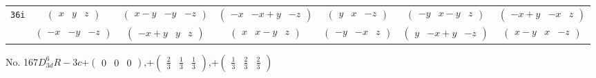 \documentclass[fleqn,9pt,landscape]{jsarticle}
\begin{document}
\begin{center}
\begin{longtable}{ccccccc}
{\tt 36i} & $ \begin{pmatrix} x & y & z \end{pmatrix} $ & $ \begin{pmatrix} x - y & - y & - z \end{pmatrix} $ & $ \begin{pmatrix} - x & - x + y & - z \end{pmatrix} $ & $ \begin{pmatrix} y & x & - z \end{pmatrix} $ & $ \begin{pmatrix} - y & x - y & z \end{pmatrix} $ & $ \begin{pmatrix} - x + y & - x & z \end{pmatrix} $ \\
& $ \begin{pmatrix} - x & - y & - z \end{pmatrix} $ & $ \begin{pmatrix} - x + y & y & z \end{pmatrix} $ & $ \begin{pmatrix} x & x - y & z \end{pmatrix} $ & $ \begin{pmatrix} - y & - x & z \end{pmatrix} $ & $ \begin{pmatrix} y & - x + y & - z \end{pmatrix} $ & $ \begin{pmatrix} x - y & x & - z \end{pmatrix} $ \\
\end{longtable}
\end{center}
\newpage
No. 167\quad$D_{3d}^{6}$\quad$R-3c$\quad[ trigonal ]\quad$+\begin{pmatrix} 0 & 0 & 0 \end{pmatrix}$,\quad $+\begin{pmatrix} \frac{2}{3} & \frac{1}{3} & \frac{1}{3} \end{pmatrix}$,\quad $+\begin{pmatrix} \frac{1}{3} & \frac{2}{3} & \frac{2}{3} \end{pmatrix}$
\end{document}
